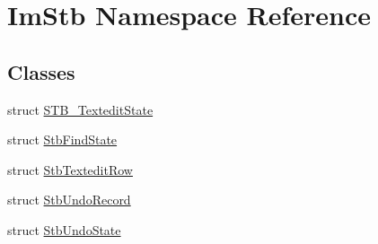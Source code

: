 \hypertarget{namespaceImStb}{}\section{Im\+Stb Namespace Reference}
\label{namespaceImStb}
\subsection*{Classes}
\begin{DoxyCompactItemize}
\item 
struct \hyperlink{structImStb_1_1STB__TexteditState}{S\+T\+B\+\_\+\+Textedit\+State}
\item 
struct \hyperlink{structImStb_1_1StbFindState}{Stb\+Find\+State}
\item 
struct \hyperlink{structImStb_1_1StbTexteditRow}{Stb\+Textedit\+Row}
\item 
struct \hyperlink{structImStb_1_1StbUndoRecord}{Stb\+Undo\+Record}
\item 
struct \hyperlink{structImStb_1_1StbUndoState}{Stb\+Undo\+State}
\end{DoxyCompactItemize}
